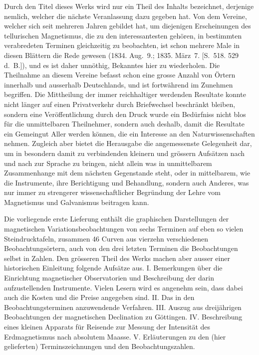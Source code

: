 \documentclass[fontsize=10pt,paper=a5,pagesize=auto]{scrbook}
\newcommand{\origpage}[1]{\marginpar{\footnotesize\textit{S. #1}}}
\begin{document}
\origpage{596}
Durch den Titel dieses Werks wird nur ein Theil des Inhalts bezeichnet, derjenige nemlich, welcher die nächste Veranlassung dazu gegeben hat. Von dem Vereine, welcher sich seit mehreren Jahren gebildet hat, um diejenigen Erscheinungen des tellurischen Magnetismus, die zu den interessantesten gehören, in bestimmten verabredeten Terminen gleichzeitig zu beobachten, ist schon mehrere Male in diesen Blättern die Rede gewesen (1834. Aug.~9.; 1835. März~7. [S.~518. 529 d.~B.]), und es ist daher unnöthig, Bekanntes hier zu wiederholen. Die Theilnahme an diesem Vereine befasst schon eine grosse Anzahl von Örtern innerhalb und ausserhalb Deutschlands, und ist fortwährend im Zunehmen begriffen. Die Mittheilung der immer reichhaltiger werdenden Resultate konnte nicht länger auf einen Privatverkehr durch Briefwechsel beschränkt bleiben, sondern eine Veröffentlichung durch den Druck wurde ein Bedürfniss nicht blos für die unmittelbaren Theilnehmer, sondern auch deshalb, damit die Resultate ein Gemeingut Aller werden können, die ein Interesse an den Naturwissenschaften nehmen. Zugleich aber bietet die Herausgabe die angemessenste Gelegenheit dar, um in besondern damit zu verbindenden kleinern und grössern Aufsätzen nach und nach zur Sprache zu bringen, nicht allein was in unmittelbarem Zusammenhange mit dem nächsten Gegenstande steht, oder in mittelbarem, wie die Instrumente, ihre Berichtigung und Behandlung, sondern auch Anderes, was nur immer zu strengerer wissenschaftlicher Begründung der Lehre vom Magnetismus und Galvanismus beitragen kann.

\origpage{596}
Die vorliegende erste Lieferung enthält die graphischen Darstellungen der magnetischen Variationsbeobachtungen von sechs Terminen auf eben so vielen Steindrucktafeln, zusammen 46 Curven aus vierzehn verschiedenen Beobachtungsörtern, auch von den drei letzten Terminen die Beobachtungen selbst in Zahlen. Den grösseren Theil des Werks machen aber ausser einer historischen Einleitung folgende Aufsätze aus. \textsc{I.} Bemerkungen über die Einrichtung magnetischer Observatorien und Beschreibung der darin aufzustellenden Instrumente. Vielen Lesern wird es angenehm sein, dass dabei auch die Kosten und die Preise angegeben sind. \textsc{II.} Das in den Beobachtungsterminen anzuwendende Verfahren. \textsc{III.} Auszug aus dreijährigen Beobachtungen der magnetischen Declination zu Göttingen. \textsc{IV.} Beschreibung eines kleinen Apparats für Reisende zur Messung der Intensität des Erdmagnetismus nach absolutem Maasse. \textsc{V.} Erläuterungen zu den (hier gelieferten) Terminszeichnungen und den Beobachtungszahlen.
\end{document}
